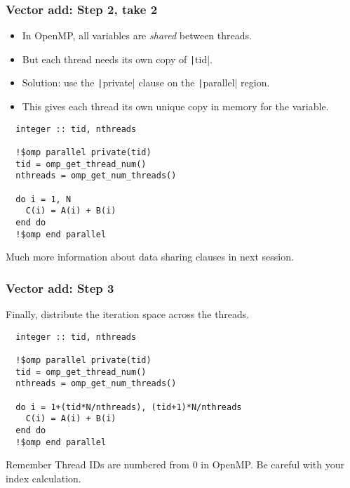 \documentclass{beamer}
\begin{document}
\begin{frame}[fragile]
\frametitle{Vector add: Step 2, take 2}

\begin{itemize}
  \item In OpenMP, all variables are \emph{shared} between threads.
  \item But each thread needs its own copy of \texttt|tid|.
  \item Solution: use the \texttt|private| clause on the \texttt|parallel| region.
  \item This gives each thread its own unique copy in memory for the variable.
\end{itemize}

\begin{verbatim}
  integer :: tid, nthreads

  !$omp parallel private(tid)
  tid = omp_get_thread_num()
  nthreads = omp_get_num_threads()

  do i = 1, N
    C(i) = A(i) + B(i)
  end do
  !$omp end parallel
\end{verbatim}
Much more information about data sharing clauses in next session.
\end{frame}

\begin{frame}[fragile]
\frametitle{Vector add: Step 3}
Finally, distribute the iteration space across the threads.
\begin{verbatim}
  integer :: tid, nthreads

  !$omp parallel private(tid)
  tid = omp_get_thread_num()
  nthreads = omp_get_num_threads()

  do i = 1+(tid*N/nthreads), (tid+1)*N/nthreads
    C(i) = A(i) + B(i)
  end do
  !$omp end parallel
\end{verbatim}
\begin{block}{Remember}
Thread IDs are numbered from 0 in OpenMP.
Be careful with your index calculation.
\end{block}
\end{frame}

\end{document}
